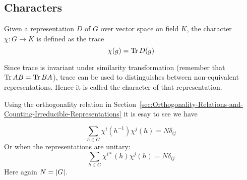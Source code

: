 \subsection{Characters}
\label{sec:Characters}
\begin{defi}
    Given a representation $D$ of $G$ over vector space on field $K$,
    the character $\chi: G\to K$ is
    defined as the trace
    \begin{equation}
        \chi(g) = \Tr D(g)
    \end{equation}
\end{defi}
\begin{remark}
    Since trace is invariant under similarity transformation (remember
    that $\Tr AB = \Tr BA$), trace can be used to distinguishes
    between non-equivalent representations. Hence it is called the
    character of that representation.
\end{remark}
Using the orthogonality relation in
Section~\ref{sec:Orthogonality-Relations-and-Counting-Irreducible-Representations}
it is esay to see we have
\begin{coro}
    \begin{equation}
        \sum_{h\in G} \chi^{i}(h^{-1})\chi^j(h) = N \delta_{ij}
    \end{equation}
    Or when the representations are unitary:
    \begin{equation}
        \sum_{h\in G} \chi^{i*}(h)\chi^j(h) = N \delta_{ij}
    \end{equation}
    Here again $N = \abs{G}$.
\end{coro}
